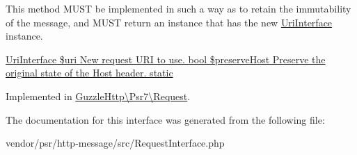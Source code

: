 This method M\+U\+ST be implemented in such a way as to retain the immutability of the message, and M\+U\+ST return an instance that has the new \hyperlink{interfacePsr_1_1Http_1_1Message_1_1UriInterface}{Uri\+Interface} instance.

\hyperlink{}{Uri\+Interface \$uri New request U\+RI to use.  bool \$preserve\+Host Preserve the original state of the Host header.  static }

Implemented in \hyperlink{classGuzzleHttp_1_1Psr7_1_1Request_a1eb2a7b7048ec8b1e10ae535709f6917}{Guzzle\+Http\textbackslash{}\+Psr7\textbackslash{}\+Request}.



The documentation for this interface was generated from the following file\+:\begin{DoxyCompactItemize}
\item 
vendor/psr/http-\/message/src/Request\+Interface.\+php\end{DoxyCompactItemize}
